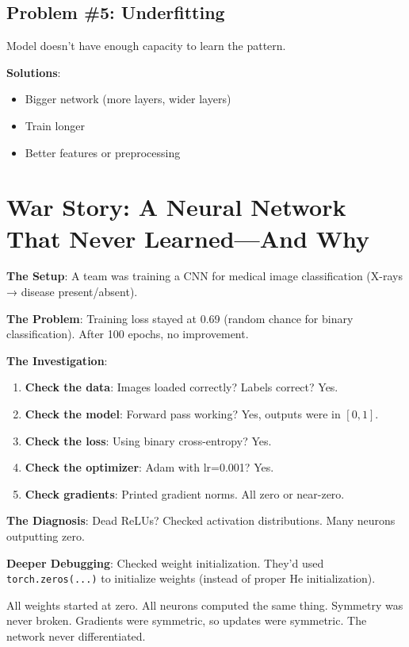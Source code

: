 \subsection{Problem \#5: Underfitting}

Model doesn't have enough capacity to learn the pattern.

\textbf{Solutions}:
\begin{itemize}
\item Bigger network (more layers, wider layers)
\item Train longer
\item Better features or preprocessing
\end{itemize}

\section{War Story: A Neural Network That Never Learned---And Why}

\textbf{The Setup}: A team was training a CNN for medical image classification (X-rays → disease present/absent).

\textbf{The Problem}: Training loss stayed at 0.69 (random chance for binary classification). After 100 epochs, no improvement.

\textbf{The Investigation}:

\begin{enumerate}
\item \textbf{Check the data}: Images loaded correctly? Labels correct? Yes.
\item \textbf{Check the model}: Forward pass working? Yes, outputs were in $[0, 1]$.
\item \textbf{Check the loss}: Using binary cross-entropy? Yes.
\item \textbf{Check the optimizer}: Adam with lr=0.001? Yes.
\item \textbf{Check gradients}: Printed gradient norms. All zero or near-zero.
\end{enumerate}

\textbf{The Diagnosis}: Dead ReLUs? Checked activation distributions. Many neurons outputting zero.

\textbf{Deeper Debugging}: Checked weight initialization. They'd used \texttt{torch.zeros(...)} to initialize weights (instead of proper He initialization).

All weights started at zero. All neurons computed the same thing. Symmetry was never broken. Gradients were symmetric, so updates were symmetric. The network never differentiated.

